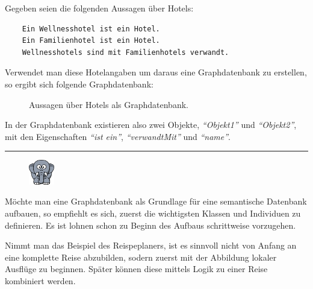 \newpage

Gegeben seien die folgenden Aussagen über Hotels:
\begin{lstlisting}
    Ein Wellnesshotel ist ein Hotel.
    Ein Familienhotel ist ein Hotel.
    Wellnesshotels sind mit Familienhotels verwandt.
\end{lstlisting}

Verwendet man diese Hotelangaben um daraus eine Graphdatenbank zu erstellen, so ergibt sich folgende Graphdatenbank:
\begin{figure}[htbp]
\centering {}
\caption{Aussagen über Hotels als Graphdatenbank.\label{fig:hotels_graphdatenbank}\protect\footnotemark}
\end{figure}

In der Graphdatenbank existieren also zwei Objekte, \textit{``Objekt1''} und \textit{``Objekt2''}, mit den Eigenschaften \textit{``ist ein''}, \textit{``verwandtMit''} und \textit{``name''}.

\newpage

\noindent\rule[1ex]{\textwidth}{1pt}
\begin{figure}
    \vspace{-12pt}
    \includegraphics[width=0.1\textwidth]{bilder/elephant.png}
\end{figure}
\label{elephant_graph_data}
Möchte man eine Graphdatenbank als Grundlage für eine semantische Datenbank aufbauen, so empfiehlt es sich, zuerst die wichtigsten Klassen und Individuen zu definieren. Es ist lohnen schon zu Beginn des Aufbaus schrittweise vorzugehen.

Nimmt man das Beispiel des Reispeplaners, ist es sinnvoll nicht von Anfang an eine komplette Reise abzubilden, sodern zuerst mit der Abbildung lokaler Ausflüge zu beginnen. Später können diese mittels Logik zu einer Reise kombiniert werden.

